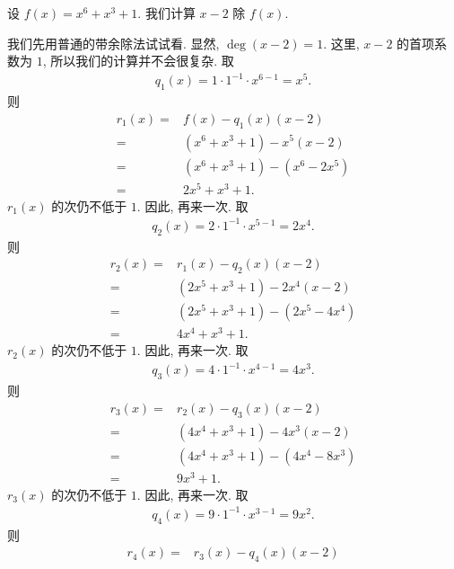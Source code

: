 \begin{example}
    设 $f(x) = x^6 + x^3 + 1$. 我们计算 $x - 2$ 除 $f(x)$.

    我们先用普通的带余除法试试看. 显然, $\deg {(x-2)} = 1$. 这里, $x - 2$ 的首项系数为 $1$, 所以我们的计算并不会很复杂. 取
    \begin{align*}
        q_1 (x) = 1 \cdot 1^{-1} \cdot x^{6-1} = x^5.
    \end{align*}
    则
    \begin{align*}
        r_1 (x)
        = {} & f(x) - q_1 (x) (x - 2)         \\
        = {} & (x^6 + x^3 + 1) - x^5 (x - 2)  \\
        = {} & (x^6 + x^3 + 1) - (x^6 - 2x^5) \\
        = {} & 2x^5 + x^3 + 1.
    \end{align*}
    $r_1 (x)$ 的次仍不低于 $1$. 因此, 再来一次. 取
    \begin{align*}
        q_2 (x) = 2 \cdot 1^{-1} \cdot x^{5-1} = 2x^4.
    \end{align*}
    则
    \begin{align*}
        r_2 (x)
        = {} & r_1 (x) - q_2 (x) (x - 2)        \\
        = {} & (2x^5 + x^3 + 1) - 2x^4 (x - 2)  \\
        = {} & (2x^5 + x^3 + 1) - (2x^5 - 4x^4) \\
        = {} & 4x^4 + x^3 + 1.
    \end{align*}
    $r_2 (x)$ 的次仍不低于 $1$. 因此, 再来一次. 取
    \begin{align*}
        q_3 (x) = 4 \cdot 1^{-1} \cdot x^{4-1} = 4x^3.
    \end{align*}
    则
    \begin{align*}
        r_3 (x)
        = {} & r_2 (x) - q_3 (x) (x - 2)        \\
        = {} & (4x^4 + x^3 + 1) - 4x^3 (x - 2)  \\
        = {} & (4x^4 + x^3 + 1) - (4x^4 - 8x^3) \\
        = {} & 9x^3 + 1.
    \end{align*}
    $r_3 (x)$ 的次仍不低于 $1$. 因此, 再来一次. 取
    \begin{align*}
        q_4 (x) = 9 \cdot 1^{-1} \cdot x^{3-1} = 9x^2.
    \end{align*}
    则
    \begin{align*}
        r_4 (x)
        = {} & r_3 (x) - q_4 (x) (x - 2)   \\

\end{align*}
\end{example}
